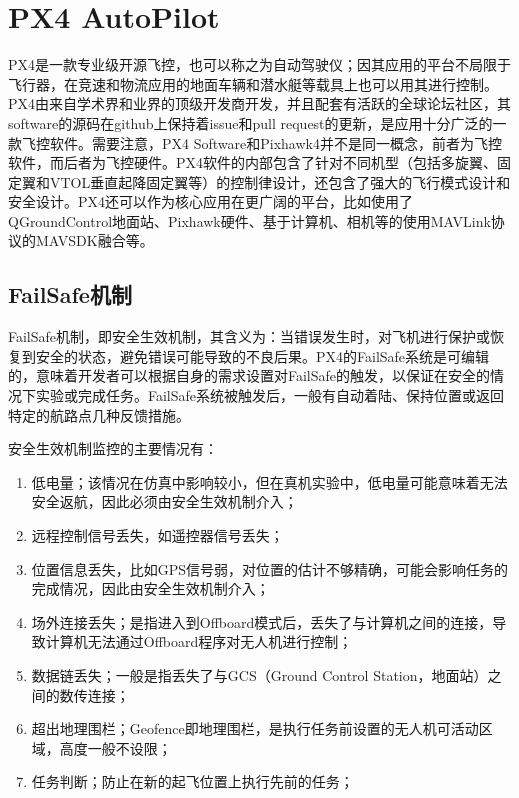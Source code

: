 
\section{PX4 AutoPilot}
PX4是一款专业级开源飞控，也可以称之为自动驾驶仪；因其应用的平台不局限于飞行器，在竞速和物流应用的地面车辆和潜水艇等载具上也可以用其进行控制。PX4由来自学术界和业界的顶级开发商开发，并且配套有活跃的全球论坛社区，其software的源码在github上保持着issue和pull request的更新，是应用十分广泛的一款飞控软件。需要注意，PX4 Software和Pixhawk4并不是同一概念，前者为飞控软件，而后者为飞控硬件。PX4软件的内部包含了针对不同机型（包括多旋翼、固定翼和VTOL垂直起降固定翼等）的控制律设计，还包含了强大的飞行模式设计和安全设计。PX4还可以作为核心应用在更广阔的平台，比如使用了QGroundControl地面站、Pixhawk硬件、基于计算机、相机等的使用MAVLink协议的MAVSDK融合等。


\subsection{FailSafe机制} \label{2.2.1}
FailSafe机制，即安全生效机制，其含义为：当错误发生时，对飞机进行保护或恢复到安全的状态，避免错误可能导致的不良后果。PX4的FailSafe系统是可编辑的，意味着开发者可以根据自身的需求设置对FailSafe的触发，以保证在安全的情况下实验或完成任务。FailSafe系统被触发后，一般有自动着陆、保持位置或返回特定的航路点几种反馈措施。

安全生效机制监控的主要情况有：
\begin{enumerate}
	\item 低电量；该情况在仿真中影响较小，但在真机实验中，低电量可能意味着无法安全返航，因此必须由安全生效机制介入；
	\item 远程控制信号丢失，如遥控器信号丢失；
	\item 位置信息丢失，比如GPS信号弱，对位置的估计不够精确，可能会影响任务的完成情况，因此由安全生效机制介入；
	\item 场外连接丢失；是指进入到Offboard模式后，丢失了与计算机之间的连接，导致计算机无法通过Offboard程序对无人机进行控制；
	\item 数据链丢失；一般是指丢失了与GCS（Ground Control Station，地面站）之间的数传连接；
	\item 超出地理围栏；Geofence即地理围栏，是执行任务前设置的无人机可活动区域，高度一般不设限；
	\item 任务判断；防止在新的起飞位置上执行先前的任务；
\end{enumerate}

